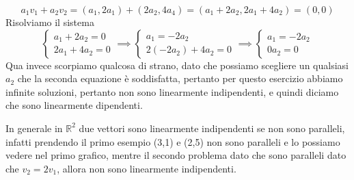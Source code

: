 \documentclass{rapport}
\begin{document}
\[
a_1v_1 +a_2v_2 = (a_1, 2a_1) + (2a_2, 4a_4) = (a_1+2a_2, 2a_1+4a_2) = (0,0)
\]
Risolviamo il sistema
\[
\begin{cases}
  a_1+2a_2 = 0 \\
  2a_1+4a_2 = 0
\end{cases} \implies
\begin{cases}
  a_1 = -2a_2 \\
  2(-2a_2)+4a_2 = 0
\end{cases} \implies
\begin{cases}
  a_1 = -2a_2 \\
  0a_2 = 0
\end{cases} 
\]
 Qua invece scorpiamo qualcosa di strano, dato che possiamo scegliere un qualsiasi $a_2$ che la seconda equazione è soddisfatta, pertanto per questo esercizio abbiamo infinite soluzioni, pertanto non sono linearmente indipendenti, e quindi diciamo che sono linearmente dipendenti.

In generale in $\mathbb{R}^2$ due vettori sono linearmente indipendenti se non sono paralleli, infatti prendendo il primo esempio (3,1) e (2,5) non sono paralleli e lo possiamo vedere nel primo grafico, mentre il secondo problema dato che sono paralleli dato che $v_2=2v_1$, allora non sono linearmente indipendenti.
\end{document}
